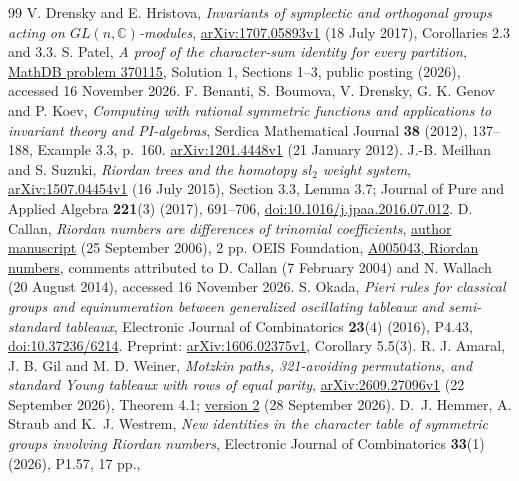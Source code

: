 \documentclass[11pt]{article}
\begin{document}
\begin{thebibliography}{99}
V. Drensky and E. Hristova, \emph{Invariants of symplectic and orthogonal
groups acting on $GL(n,\mathbb C)$-modules},
\href{https://arxiv.org/abs/1707.05893v1}{arXiv:1707.05893v1}
(18 July 2017), Corollaries 2.3 and 3.3.
S. Patel, \emph{A proof of the character-sum identity for every partition},
\href{https://mathdb.com/p/370115/the-n-1-conjecture-for-character-sums-over-riordan-partition}{MathDB problem 370115},
Solution 1, Sections 1--3, public posting (2026), accessed 16 November 2026.
F. Benanti, S. Boumova, V. Drensky, G. K. Genov and P. Koev,
\emph{Computing with rational symmetric functions and applications to
invariant theory and PI-algebras}, Serdica Mathematical Journal
\textbf{38} (2012), 137--188, Example 3.3, p.~160.
\href{https://arxiv.org/abs/1201.4448v1}{arXiv:1201.4448v1}
(21 January 2012).
J.-B. Meilhan and S. Suzuki, \emph{Riordan trees and the homotopy
$sl_2$ weight system}, \href{https://arxiv.org/abs/1507.04454v1}{arXiv:1507.04454v1}
(16 July 2015), Section 3.3, Lemma 3.7; Journal of Pure and Applied Algebra
\textbf{221}(3) (2017), 691--706,
\href{https://doi.org/10.1016/j.jpaa.2016.07.012}{doi:10.1016/j.jpaa.2016.07.012}.
D. Callan, \emph{Riordan numbers are differences of trinomial coefficients},
\href{https://pages.stat.wisc.edu/~callan/notes/riordan/riordan.pdf}{author manuscript}
(25 September 2006), 2 pp.
OEIS Foundation, \href{https://oeis.org/A005043}{A005043, Riordan numbers},
comments attributed to D. Callan (7 February 2004) and N. Wallach
(20 August 2014), accessed 16 November 2026.
S. Okada, \emph{Pieri rules for classical groups and equinumeration between
generalized oscillating tableaux and semi-standard tableaux},
Electronic Journal of Combinatorics \textbf{23}(4) (2016), P4.43,
\href{https://doi.org/10.37236/6214}{doi:10.37236/6214}.
Preprint: \href{https://arxiv.org/abs/1606.02375v1}{arXiv:1606.02375v1},
Corollary 5.5(3).
R. J. Amaral, J. B. Gil and M. D. Weiner,
\emph{Motzkin paths, 321-avoiding permutations, and standard Young tableaux
with rows of equal parity},
\href{https://arxiv.org/abs/2609.27096v1}{arXiv:2609.27096v1}
(22 September 2026), Theorem 4.1;
\href{https://arxiv.org/abs/2609.27096v2}{version 2} (28 September 2026).
D.~J. Hemmer, A. Straub and K.~J. Westrem,
\emph{New identities in the character table of symmetric groups involving
Riordan numbers}, Electronic Journal of Combinatorics \textbf{33}(1)
(2026), P1.57, 17 pp.,

\end{thebibliography}
\end{document}
